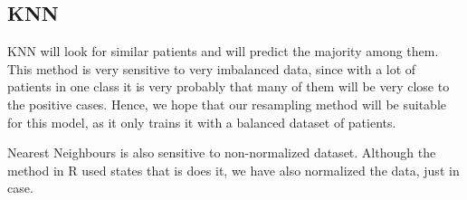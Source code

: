 
\subsection{KNN}

KNN will look for similar patients and will predict the majority among them. This method is very sensitive to very imbalanced data, since with a lot of patients in one class it is very probably that many of them will be very close to the positive cases. Hence, we hope that our resampling method will be suitable for this model, as it only trains it with a balanced dataset of patients.

Nearest Neighbours is also sensitive to non-normalized dataset. Although the method in R used states that is does it, we have also normalized the data, just in case.


